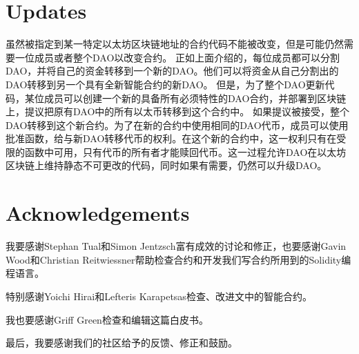 \documentclass[9pt,oneside]{amsart}
\begin{document}
\begin{multicols}{2}
\section{Updates}
虽然被指定到某一特定以太坊区块链地址的合约代码不能被改变，但是可能仍然需要一位成员或者整个DAO以改变合约。
正如上面介绍的，每位成员都可以分割DAO，并将自己的资金转移到一个新的DAO。他们可以将资金从自己分割出的DAO转移到另一个具有全新智能合约的新DAO。
但是，为了整个DAO更新代码，某位成员可以创建一个新的具备所有必须特性的DAO合约，并部署到区块链上，提议把原有DAO中的所有以太币转移到这个合约中。
如果提议被接受，整个DAO转移到这个新合约。为了在新的合约中使用相同的DAO代币，成员可以使用批准函数，给与新DAO转移代币的权利。在这个新的合约中，这一权利只有在受限的函数中可用，只有代币的所有者才能赎回代币。这一过程允许DAO在以太坊区块链上维持静态不可更改的代码，同时如果有需要，仍然可以升级DAO。

\section{Acknowledgements}
我要感谢Stephan Tual和Simon Jentzsch富有成效的讨论和修正，也要感谢Gavin Wood和Christian Reitwiessner帮助检查合约和开发我们写合约所用到的Solidity编程语言。

特别感谢Yoichi Hirai和Lefteris Karapetsas检查、改进文中的智能合约。

我也要感谢Griff Green检查和编辑这篇白皮书。

最后，我要感谢我们的社区给予的反馈、修正和鼓励。

\end{multicols}
\end{document}
